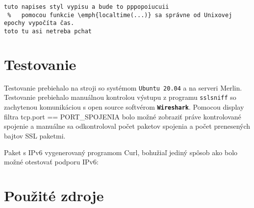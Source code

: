 \documentclass[11pt, a4paper]{article}
\begin{document}
\begin{verbatim}
tuto napises styl vypisu a bude to pppopoiucuii
 %	 pomocou funkcie \emph{localtime(...)} sa správne od Unixovej epochy vypočíta čas. 
toto tu asi netreba pchat
\end{verbatim}

	\newpage
	\section{Testovanie}
	Testovanie prebiehalo na stroji so systémom \texttt{Ubuntu 20.04} a na serveri Merlin. Testovanie prebiehalo manuálnou kontrolou výstupu z programu \texttt{sslsniff} so zachytenou komunikáciou s open source softvérom \texttt{\textbf{Wireshark}}. Pomocou display filtra tcp.port == PORT\_SPOJENIA bolo možné zobraziť práve kontrolované spojenie a manuálne sa odkontroloval počet paketov spojenia a počet prenesených bajtov SSL paketmi. 
	
	
%	
%	
\newpage
	Paket s IPv6 vygenerovaný programom Curl, bohužiaľ jediný spôsob ako bolo možné otestovať podporu IPv6:
	
%	
%	
	
	
	\newpage
	\section{Použité zdroje}
	
	
	\renewcommand{\refname}{Použitá literatúra}
	
	
	
\end{document}
